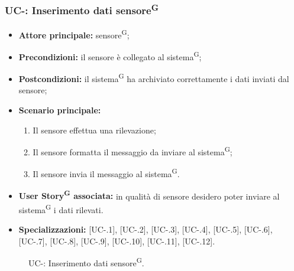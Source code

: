 \documentclass[8pt]{article}
\newcommand{\glossterm}[1]{#1\textsuperscript{G}} %
\begin{document}
\subsubsection*{UC-\ucnumber: Inserimento dati \glossterm{sensore}}
\begin{itemize}
    \item \textbf{Attore principale:} \glossterm{sensore};
    \item \textbf{Precondizioni:} il sensore è collegato al \glossterm{sistema};
    \item \textbf{Postcondizioni:} il \glossterm{sistema} ha archiviato correttamente i dati inviati dal sensore;
    \item \textbf{Scenario principale:}
        \begin{enumerate}
        \item Il sensore effettua una rilevazione;
        \item Il sensore formatta il messaggio da inviare al \glossterm{sistema};
        \item Il sensore invia il messaggio al \glossterm{sistema}.
        \end{enumerate}
    \item \textbf{\glossterm{User Story} associata:} in qualità di sensore desidero poter inviare al \glossterm{sistema} i
        dati rilevati.
    \item \textbf{Specializzazioni:} [UC-\theuc .1], [UC-\theuc .2], [UC-\theuc .3], [UC-\theuc .4], [UC-\theuc .5], [UC-\theuc .6], [UC-\theuc .7], [UC-\theuc .8], [UC-\theuc .9], [UC-\theuc .10], [UC-\theuc .11], [UC-\theuc .12].
\end{itemize}
\begin{figure}[ht!]
    \centering
    \caption{UC-\theuc: Inserimento dati \glossterm{sensore}.}
    \label{fig:UC-\theuc: Inserimento dati sensore}
\end{figure}
\setcounter{specone}{0}
\end{document}
